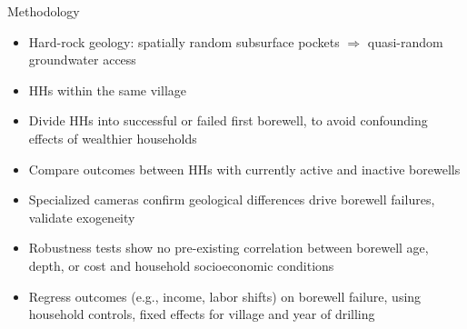 \documentclass[10pt]{beamer}
\begin{document}
\begin{frame}
	{Methodology}
	\begin{itemize}
		\item Hard-rock geology: spatially random subsurface pockets \(\Rightarrow\) quasi-random groundwater access
		\item HHs within the same village
		\item Divide HHs into successful or failed first borewell, to avoid confounding effects of wealthier households
		\item Compare outcomes between HHs with currently active and inactive borewells
		\item Specialized cameras confirm geological differences drive borewell failures, validate exogeneity
		\item Robustness tests show no pre-existing correlation between borewell age, depth, or cost and household socioeconomic conditions
		\item Regress outcomes (e.g., income, labor shifts) on borewell failure, using household controls, fixed effects for village and year of drilling
	\end{itemize}
\end{frame}
\end{document}
